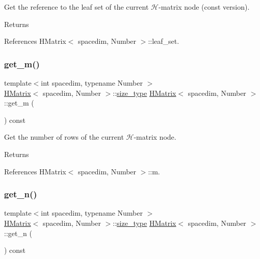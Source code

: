 Get the reference to the leaf set of the current $\mathcal{H}$-\/matrix node (const version). \begin{DoxyReturn}{Returns}

\end{DoxyReturn}


References H\+Matrix$<$ spacedim, Number $>$\+::leaf\+\_\+set.

\mbox{\label{classHMatrix_aabe735f7712a10ba5325ff116f8ca1c7}} 
\subsubsection{\texorpdfstring{get\+\_\+m()}{get\_m()}}
{\footnotesize\ttfamily template$<$int spacedim, typename Number $>$ \\
\hyperlink{classHMatrix}{H\+Matrix}$<$ spacedim, Number $>$\+::\hyperlink{classHMatrix_a5ca8dc549783d38371a01ecd621ecb34}{size\+\_\+type} \hyperlink{classHMatrix}{H\+Matrix}$<$ spacedim, Number $>$\+::get\+\_\+m (\begin{DoxyParamCaption}{ }\end{DoxyParamCaption}) const}

Get the number of rows of the current $\mathcal{H}$-\/matrix node. \begin{DoxyReturn}{Returns}

\end{DoxyReturn}


References H\+Matrix$<$ spacedim, Number $>$\+::m.

\mbox{\label{classHMatrix_abff89130116d62ea4159bc69ca11f8d5}} 
\subsubsection{\texorpdfstring{get\+\_\+n()}{get\_n()}}
{\footnotesize\ttfamily template$<$int spacedim, typename Number $>$ \\
\hyperlink{classHMatrix}{H\+Matrix}$<$ spacedim, Number $>$\+::\hyperlink{classHMatrix_a5ca8dc549783d38371a01ecd621ecb34}{size\+\_\+type} \hyperlink{classHMatrix}{H\+Matrix}$<$ spacedim, Number $>$\+::get\+\_\+n (\begin{DoxyParamCaption}{ }\end{DoxyParamCaption}) const}

